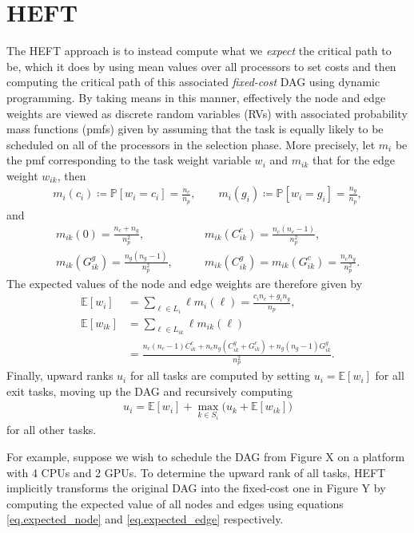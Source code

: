 \documentclass[runningheads]{llncs}
\def\P{\mathbb{P}}
\def\E{\mathbb{E}}
\begin{document}
\section{HEFT}
\label{sect.heft} 

The HEFT approach is to instead compute what we {\em expect} the critical path to be, which it does by using mean values over all processors to set costs and then computing the critical path of this associated {\em fixed-cost} DAG using dynamic programming. By taking means in this manner, effectively the node and edge weights are viewed as discrete random variables (RVs) with associated probability mass functions (pmfs) given by assuming that the task is equally likely to be scheduled on all of the processors in the selection phase. More precisely, let $m_i$ be the pmf corresponding to the task weight variable $w_i$ and $m_{ik}$ that for the edge weight $w_{ik}$, then  
\begin{align*}
m_i(c_i) \coloneqq \P[w_i = c_i] = \frac{n_c}{n_p}, \qquad m_i(g_i) \coloneqq \P[w_i = g_i] = \frac{n_g}{n_p},
\end{align*}
and   
\begin{align*}
m_{ik}(0) = \frac{n_c + n_g}{n_p^2}, &\qquad m_{ik}(C_{ik}^c) = \frac{n_c(n_c - 1)}{n_p^2}, \\
m_{ik} (G_{ik}^g) = \frac{n_g(n_g - 1)}{n_p^2}, &\qquad m_{ik}(C_{ik}^g) = m_{ik}(G_{ik}^c) = \frac{n_cn_g}{n_p^2}.
\end{align*}
The expected values of the node and edge weights are therefore given by
\begin{align}
\E[w_i] &= \sum_{\ell \in L_i} \ell m_i(\ell) = \frac{c_in_c + g_in_g}{n_p}, \label{eq.expected_node}\\
\E[w_{ik}] &= \sum_{\ell \in L_{ik}} \ell m_{ik}(\ell) \nonumber\\
&= \frac{n_c(n_c - 1)C_{ik}^c + n_cn_g(C_{ik}^g + G_{ik}^c) + n_g(n_g - 1) G_{ik}^g }{n_p^2} \label{eq.expected_edge}.
\end{align}
Finally, upward ranks $u_i$ for all tasks are computed by setting $u_i = \E[w_i]$ for all exit tasks, moving up the DAG and recursively computing
\begin{align}
u_i = \E[w_i] + \max_{k \in S_i} \big( u_k + \E[w_{ik}] \big) \label{eq.ur_expectation}
\end{align}
for all other tasks.

For example, suppose we wish to schedule the DAG from Figure X on a platform with 4 CPUs and 2 GPUs. To determine the upward rank of all tasks, HEFT implicitly transforms the original DAG into the fixed-cost one in Figure Y by computing the expected value of all nodes and edges using equations \eqref{eq.expected_node} and \eqref{eq.expected_edge} respectively.
\end{document}
